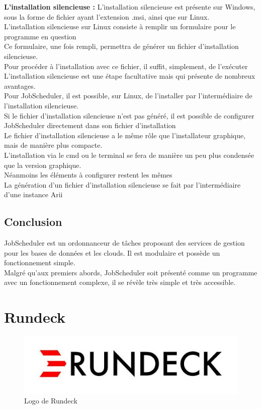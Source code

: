 \documentclass[12pt]{article}
\begin{document}
\vspace{0.5cm}
\textbf{L'installation silencieuse :}
L'installation silencieuse est présente sur Windows, sous la forme de fichier ayant l'extension .msi, ainsi que sur Linux.
\\
L'installation silencieuse sur Linux consiste à remplir un formulaire pour le programme en question
\\
Ce formulaire, une fois rempli, permettra de générer un fichier d'installation silencieuse.
\\
Pour procéder à l'installation avec ce fichier, il suffit, simplement, de l'exécuter
\\
L'installation silencieuse est une étape facultative mais qui présente de nombreux avantages.
\\
Pour JobScheduler, il est possible, sur Linux, de l'installer par l'intermédiaire de l'installation silencieuse.
\\
Si le fichier d'installation silencieuse n'est pas généré, il est possible de configurer JobScheduler directement dans son fichier d'installation
\\
Le fichier d'installation silencieuse a le même rôle que l'installateur graphique, mais de manière plus compacte.
\\
L'installation via le cmd ou le terminal se fera de manière un peu plus condensée que la version graphique.
\\
Néanmoins les éléments à configurer restent les mêmes
\\
La génération d'un fichier d'installation silencieuse se fait par l'intermédiaire d'une instance Arii

\subsection{Conclusion}
JobScheduler est un ordonnanceur de tâches proposant des services de gestion pour les bases de données et les clouds. Il est modulaire et possède un fonctionnement simple.
\\
Malgré qu'aux premiers abords, JobScheduler soit présenté comme un programme avec un fonctionnement complexe, il se révèle très simple et très accessible.

\section{Rundeck}

\begin{figure}[ht]
    \includegraphics[scale=0.8]{images/rundeck.jpg}
    \caption{Logo de Rundeck}
\end{figure}
\end{document}
